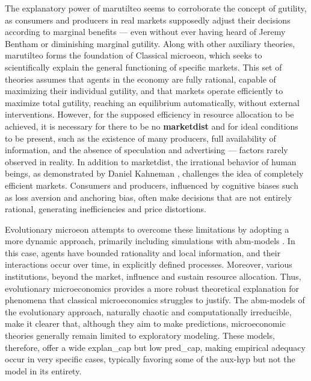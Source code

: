 \documentclass[./main_en.tex]{subfiles}
\begin{document}
\par The explanatory power of \gls{marutilteo} seems to corroborate the concept of \gls{gutility}, as consumers and producers in real markets supposedly adjust their decisions according to marginal benefits — even without ever having heard of Jeremy Bentham or diminishing marginal \gls{gutility}. Along with other auxiliary theories, \gls{marutilteo} forms the foundation of Classical \gls{microeon}, which seeks to scientifically explain the general functioning of specific markets. This set of theories assumes that agents in the economy are fully rational, capable of maximizing their individual \gls{gutility}, and that markets operate efficiently to maximize total \gls{gutility}, reaching an equilibrium automatically, without external interventions. However, for the supposed efficiency in resource allocation to be achieved, it is necessary for there to be no \textbf{\gls{marketdist}} and for ideal conditions to be present, such as the existence of many producers, full availability of information, and the absence of speculation and advertising — factors rarely observed in reality. In addition to \gls{marketdist}, the irrational behavior of human beings, as demonstrated by Daniel Kahneman \cite{kahneman2011}, challenges the idea of completely efficient markets. Consumers and producers, influenced by cognitive biases such as loss aversion and anchoring bias, often make decisions that are not entirely rational, generating inefficiencies and price distortions.

\par Evolutionary \gls{microeon} attempts to overcome these limitations by adopting a more dynamic approach, primarily including simulations with \gls{abm-models} \cite{Bourgine2006a}. In this case, agents have bounded rationality and local information, and their interactions occur over time, in explicitly defined processes. Moreover, various institutions, beyond the market, influence and sustain resource allocation. Thus, evolutionary microeconomics provides a more robust theoretical explanation for phenomena that classical microeconomics struggles to justify. The \gls{abm-models} of the evolutionary approach, naturally chaotic and computationally irreducible, make it clearer that, although they aim to make predictions, microeconomic theories generally remain limited to exploratory modeling. These models, therefore, offer a wide \gls{explan_cap} but low \gls{pred_cap}, making empirical adequacy occur in very specific cases, typically favoring some of the \gls{aux-hyp} but not the \gls{model} in its entirety.
\end{document}
